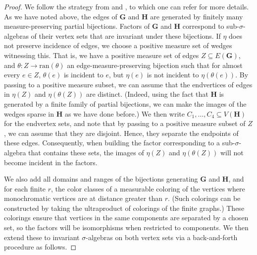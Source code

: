 \documentclass{article}
\theoremstyle{plain}
\theoremstyle{definition}
\begin{document}
\begin{proof} We follow the strategy from \cite{conley2013ultraproducts}  and
\cite[Section 2.2]{carderi2015ultraproducts}, to which one can refer for more details. As we have noted above, the edges of $\mathbf G$ and $\mathbf H$ are generated by finitely many measure-preserving partial bijections. Factors of $\mathbf G$ and $\mathbf H$ correspond to sub-$\sigma$-algebras of their vertex sets that are invariant under these bijections. If $\eta$ does not preserve incidence of edges, we choose a positive measure set  of wedges witnessing this. That is, we have a positive measure set of edges $Z \subseteq E(\mathbf{G})$, and $\theta: Z \to \mathrm{ran}(\theta)$ an edge-measure-preserving bijection such that for almost every $e \in Z$, $\theta(e)$ is incident to $e$, but $\eta(e)$ is not incident to $\eta(\theta(e))$. By passing to a positive measure subset, we can assume that the endvertices of edges in $\eta(Z)$ and $\eta(\theta(Z))$ are distinct. (Indeed, using the fact that $\mathbf{H}$ is generated by a finite family of partial bijections, we can make the images of the wedges sparse in $\mathbf{H}$ as we have done before.) We then write $C_1,\dots, C_4 \subseteq V(\mathbf H)$ for the endvertex sets, and note that by passing to a positive measure subset of $Z$, we can assume that they are disjoint. Hence, they separate the endpoints of these edges. Consequently, when building the factor corresponding to a sub-$\sigma$-algebra that contains these sets, the images of $\eta(Z)$ and $\eta(\theta(Z))$ will not become incident in the factors. 

We also add all domains and ranges of the bijections generating $\mathbf{G}$ and $\mathbf{H}$, and for each finite $r$, the color classes of a measurable coloring of the vertices where monochromatic vertices are at distance greater than $r$. (Such colorings can be constructed by taking the ultraproduct of colorings of the finite graphs.) These colorings ensure that vertices in the same components are separated by a chosen set, so the factors will be isomorphisms when restricted to components. We then extend these to invariant $\sigma$-algebras on both vertex sets via a back-and-forth procedure as follows. 


\end{proof}
\end{document}
